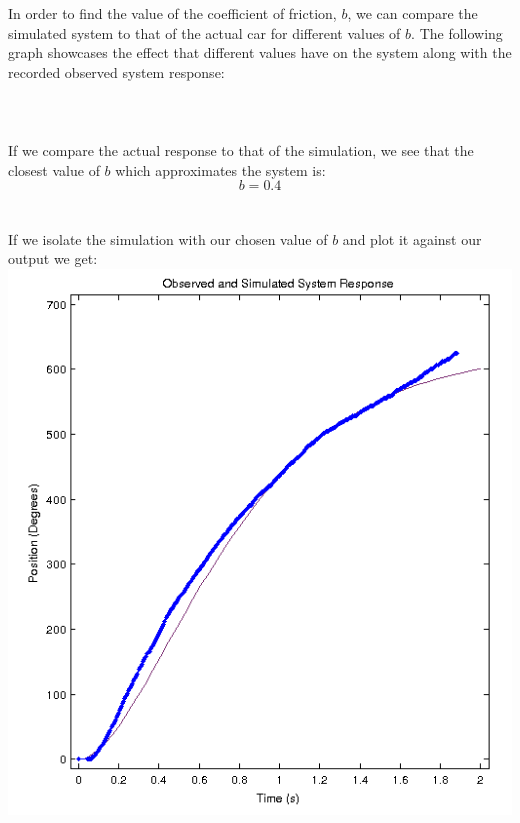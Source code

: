 \documentclass{article}
\begin{document}
{In order to find the value of the coefficient of friction, $b$, we can compare the simulated system to that of the actual car for different values of $b$. The following graph showcases the effect that different values have on the system along with the recorded observed system response:
\\
\\
}
\\
\\
If we compare the actual response to that of the simulation, we see that the closest value of $b$ which approximates the system is:
\\
\[ b = 0.4 \]
\\
\pagebreak
\\
If we isolate the simulation with our chosen value of $b$ and plot it against our output we get:
\\
\includegraphics[width=14cm]{ChosenSimComparitive.png}
\end{document}
